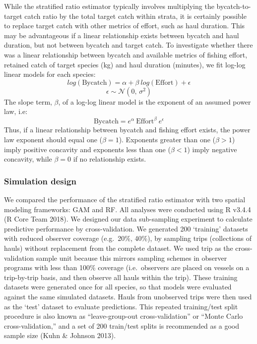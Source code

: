 \documentclass[]{article}
\begin{document}
While the stratified ratio estimator typically involves multiplying the
bycatch-to-target catch ratio by the total target catch within strata,
it is certainly possible to replace target catch with other metrics of
effort, such as haul duration. This may be advantageous if a linear
relationship exists between bycatch and haul duration, but not between
bycatch and target catch. To investigate whether there was a linear
relationship between bycatch and available metrics of fishing effort,
retained catch of target species (kg) and haul duration (minutes), we
fit log-log linear models for each species:
\[ log(\text{Bycatch}) = \alpha + \beta \ log(\text{Effort}) + \epsilon\]
\[ \epsilon \sim \mathcal{N}(0,\,\sigma^{2})\] The slope term,
\(\beta\), of a log-log linear model is the exponent of an assumed power
law, i.e:
\[ \text{Bycatch} = e^\alpha \ \text{Effort}^{\beta} \ e^\epsilon\]
Thus, if a linear relationship between bycatch and fishing effort
exists, the power law exponent should equal one (\(\beta = 1\)).
Exponents greater than one (\(\beta > 1\)) imply positive concavity and
exponents less than one (\(\beta < 1\)) imply negative concavity, while
\(\beta = 0\) if no relationship exists.

\hypertarget{simulation-design}{%
\subsubsection{Simulation design}\label{simulation-design}}

We compared the performance of the stratified ratio estimator with two
spatial modeling frameworks: GAM and RF. All analyses were conducted
using R v3.4.4 (R Core Team 2018). We designed our data sub-sampling
experiment to calculate predictive performance by cross-validation. We
generated 200 `training' datasets with reduced observer coverage
(e.g.~20\%, 40\%), by sampling trips (collections of hauls) without
replacement from the complete dataset. We used trip as the
cross-validation sample unit because this mirrors sampling schemes in
observer programs with less than 100\% coverage (i.e.~observers are
placed on vessels on a trip-by-trip basis, and then observe all hauls
within the trip). These training datasets were generated once for all
species, so that models were evaluated against the same simulated
datasets. Hauls from unobserved trips were then used as the `test'
dataset to evaluate predictions. This repeated training/test split
procedure is also known as ``leave-group-out cross-validation'' or
``Monte Carlo cross-validation,'' and a set of 200 train/test splits is
recommended as a good sample size (Kuhn \& Johnson 2013).
\end{document}
